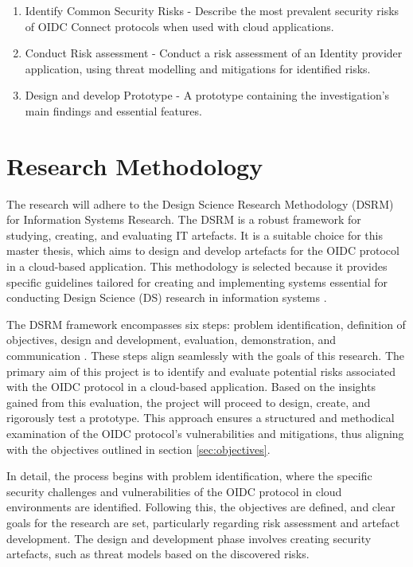 \begin{enumerate}
  \item Identify Common Security Risks - Describe the most prevalent security risks of OIDC Connect protocols when used with cloud applications.
  \item Conduct Risk assessment  - Conduct a risk assessment of an Identity provider application, using threat modelling and mitigations for identified risks.
  \item Design and develop Prototype - A prototype containing the investigation's main findings and essential features.
\end{enumerate}


\section{Research Methodology}
The research will adhere to the Design Science Research Methodology (DSRM) for Information Systems Research. The DSRM is a robust framework for studying, creating, and evaluating IT artefacts. It is a suitable choice for this master thesis, which aims to design and develop artefacts for the OIDC protocol in a cloud-based application. This methodology is selected because it provides specific guidelines tailored for creating and implementing systems essential for conducting Design Science (DS) research in information systems \citep{dsrm}.

The DSRM framework encompasses six steps: problem identification, definition of objectives, design and development, evaluation, demonstration, and communication \citep{dsrm}. These steps align seamlessly with the goals of this research. The primary aim of this project is to identify and evaluate potential risks associated with the OIDC protocol in a cloud-based application. Based on the insights gained from this evaluation, the project will proceed to design, create, and rigorously test a prototype. This approach ensures a structured and methodical examination of the OIDC protocol’s vulnerabilities and mitigations, thus aligning with the objectives outlined in section \ref{sec:objectives}.

In detail, the process begins with problem identification, where the specific security challenges and vulnerabilities of the OIDC protocol in cloud environments are identified. Following this, the objectives are defined, and clear goals for the research are set, particularly regarding risk assessment and artefact development. The design and development phase involves creating security artefacts, such as threat models based on the discovered risks.

